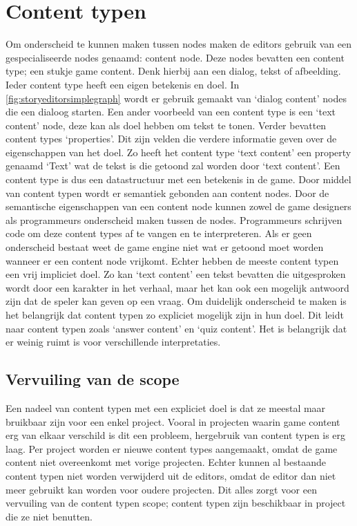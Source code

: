 \section{Content typen}
Om onderscheid te kunnen maken tussen nodes maken de editors gebruik van een gespecialiseerde nodes genaamd: content node. Deze nodes bevatten een content type; een stukje game content. Denk hierbij aan een dialog, tekst of afbeelding. Ieder content type heeft een eigen betekenis en doel. In \autoref{fig:storyeditorsimplegraph} wordt er gebruik gemaakt van ‘dialog content’ nodes die een dialoog starten. Een ander voorbeeld van een content type is een ‘text content’ node, deze kan als doel hebben om tekst te tonen. Verder bevatten content types ‘properties’. Dit zijn velden die verdere informatie geven over de eigenschappen van het doel. Zo heeft het content type ‘text content’ een property genaamd ‘Text' wat de tekst is die getoond zal worden door ‘text content’. Een content type is dus een datastructuur met een betekenis in de game. Door middel van content typen wordt er semantiek gebonden aan content nodes.
Door de semantische eigenschappen van een content node kunnen zowel de game designers als programmeurs onderscheid maken tussen de nodes. Programmeurs schrijven code om deze content types af te vangen en te interpreteren. Als er geen onderscheid bestaat weet de game engine niet wat er getoond moet worden wanneer er een content node vrijkomt.
Echter hebben de meeste content typen een vrij impliciet doel. Zo kan ‘text content’ een tekst bevatten die uitgesproken wordt door een karakter in het verhaal, maar het kan ook een mogelijk antwoord zijn dat de speler kan geven op een vraag. Om duidelijk onderscheid te maken is het belangrijk dat content typen zo expliciet mogelijk zijn in hun doel. Dit leidt naar content typen zoals ‘answer content’ en ‘quiz content’. Het is belangrijk dat er weinig ruimt is voor verschillende interpretaties.

\subsection{Vervuiling van de scope}
Een nadeel van content typen met een expliciet doel is dat ze meestal maar bruikbaar zijn voor een enkel project. Vooral in projecten waarin game content erg van elkaar verschild is dit een probleem, hergebruik van content typen is erg laag. Per project worden er nieuwe content types aangemaakt, omdat de game content niet overeenkomt met vorige projecten. Echter kunnen al bestaande content typen niet worden verwijderd uit de editors, omdat de editor dan niet meer gebruikt kan worden voor oudere projecten. Dit alles zorgt voor een vervuiling van de content typen scope; content typen zijn beschikbaar in project die ze niet benutten.

